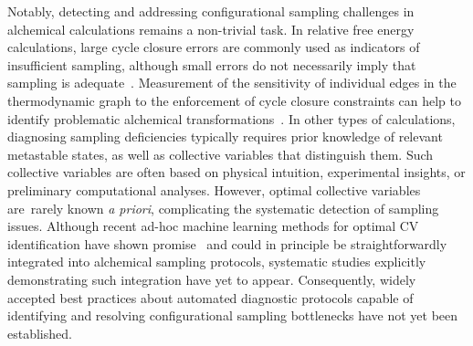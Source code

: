 \documentclass[9pt,bestpractices]{livecoms}
\begin{document}
Notably, detecting and addressing configurational sampling challenges in alchemical calculations remains a non-trivial task. In relative free energy calculations, large cycle closure errors are commonly used as indicators of insufficient sampling, although small errors do not necessarily imply that sampling is adequate~\cite{suruzhon2021sensitivity}. Measurement of the sensitivity of individual edges in the thermodynamic graph to the enforcement of cycle closure constraints can help to identify problematic alchemical transformations~\cite{giese2025transferability}. In other types of calculations, diagnosing sampling deficiencies typically requires prior knowledge of relevant metastable states, as well as collective variables that distinguish them. Such collective variables are often based on physical intuition, experimental insights, or preliminary computational analyses. However, optimal collective variables are rarely known \textit{a priori}, complicating the systematic detection of sampling issues. Although recent ad-hoc machine learning methods for optimal CV identification have shown promise~\cite{gokdemir2025machine, sidky2020machine, bonati2021deep} and could in principle be straightforwardly integrated into alchemical sampling protocols, systematic studies explicitly demonstrating such integration have yet to appear. Consequently, widely accepted best practices about automated diagnostic protocols capable of identifying and resolving configurational sampling bottlenecks have not yet been established. 
\end{document}
